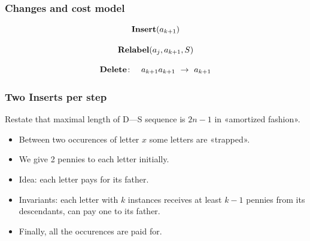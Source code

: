 \documentclass[aspectratio=1610,12pt,notheorems]{beamer}
\begin{document}
\begin{frame} \frametitle{Changes and cost model}

\begin{block}{\vspace*{-3ex}} \vspace{-2.2ex}
	$$\text{\bf Insert} (a_{k+1})$$
\end{block}

\begin{block}{\vspace*{-3ex}} \vspace{-2.2ex}
	$$\text{\bf Relabel} (a_j, a_{k+1}, S)$$
\end{block}

	$$\text{\bf Delete} \colon\quad a_{k+1}a_{k+1}\ 
	    \rightarrow\ a_{k+1}$$

\end{frame}

\begin{frame} \frametitle{Two Inserts per step}

\begin{block}{\vspace*{-3ex}}
Restate that maximal length of D—S sequence is $2n-1$ in «amortized fashion».
\end{block}

\begin{itemize}
	\item Between two occurences of letter $x$ some letters are «trapped». \medskip
	\item We give 2 pennies to each letter initially. \medskip
	\item Idea: each letter pays for its father. \medskip
	\item Invariants: each letter with $k$ instances receives at least $k-1$ pennies from its descendants, can pay one to its father. \medskip
	\item Finally, all the occurences are paid for.
\end{itemize} \vspace{1cm}
\end{frame}
\end{document}
